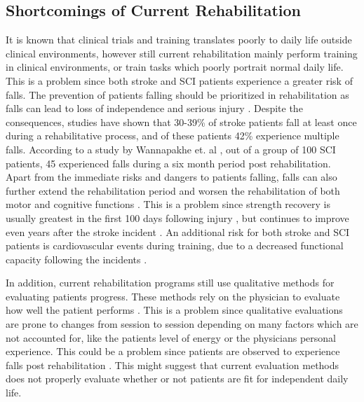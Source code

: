 
\subsection{Shortcomings of Current Rehabilitation}

It is known that clinical trials and training translates poorly to daily life outside clinical environments, however still current rehabilitation mainly perform training in clinical environments, or train tasks which poorly portrait normal daily life. \cite{Basteris2014}
This is a problem since both stroke and SCI patients experience a greater risk of falls. The prevention of patients falling should be prioritized in rehabilitation as falls can lead to loss of independence and serious injury \cite{Zehr2011}. Despite the consequences, studies have shown that 30-39\% of stroke patients fall at least once during a rehabilitative process, and of these patients 42\% experience multiple falls. \cite{Bhalla2016, Hanger2014} According to a study by Wannapakhe et. al \cite{Wannapakhe2015}, out of a group of 100 SCI patients, 45 experienced falls during a six month period post rehabilitation. %
Apart from the immediate risks and dangers to patients falling, falls can also further extend the rehabilitation period and worsen the rehabilitation of both motor and cognitive functions \cite{Wong2016, Blennerhassett2012}. This is a problem since strength recovery is usually greatest in the first 100 days following injury \cite{Weidner2017}, but continues to improve even years after the stroke incident \cite{Sun2015}. An additional risk for both stroke and SCI patients is cardiovascular events during training, due to a decreased functional capacity following the incidents \cite{Zehr2011}.

In addition, current rehabilitation programs still use qualitative methods for evaluating patients progress. These methods rely on the physician to evaluate how well the patient performs \cite{ANPT_SCI2018, ANPT_Stroke2018}. This is a problem since qualitative evaluations are prone to changes from session to session depending on many factors which are not accounted for, like the patients level of energy or the physicians personal experience. This could be a problem since patients are observed to experience falls post rehabilitation \cite{Bhalla2016, Hanger2014, Wannapakhe2015}. This might suggest that current evaluation methods does not properly evaluate whether or not patients are fit for independent daily life. 




